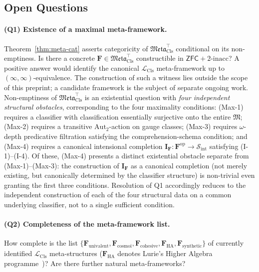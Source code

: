 \documentclass[11pt]{article}
\theoremstyle{plain}
\theoremstyle{definition}
\newcommand{\cS}{\mathcal{S}}
\newcommand{\fM}{\mathfrak{M}}
\newcommand{\Meta}{\mathfrak{Meta}}
\newcommand{\LCls}{\mathcal{L}_{\mathrm{Cls}}}
\newcommand{\Sint}{\cS_{\mathrm{int}}}
\newcommand{\ZFC}{\mathsf{ZFC}}
\newcommand{\II}{\mathbf{I}}
\begin{document}
\subsection{Open Questions}

\paragraph{(Q1) Existence of a maximal meta-framework.} Theorem~\ref{thm:meta-cat} asserts categoricity of $\Meta_{\mathrm{Cls}}^{\top}$ conditional on its non-emptiness. Is there a concrete $\mathbf{F} \in \Meta_{\mathrm{Cls}}^{\top}$ constructible in $\ZFC + 2\text{-inacc}$? A positive answer would identify the canonical $\LCls$ meta-framework up to $(\infty, \infty)$-equivalence. The construction of such a witness lies outside the scope of this preprint; a candidate framework is the subject of separate ongoing work. Non-emptiness of $\Meta_{\mathrm{Cls}}^{\top}$ is an existential question with \emph{four independent structural obstacles}, corresponding to the four maximality conditions: (Max-1) requires a classifier with classification essentially surjective onto the entire $\fM$; (Max-2) requires a transitive $\mathrm{Aut}_2$-action on gauge classes; (Max-3) requires $\omega$-depth predicative filtration satisfying the comprehension-schema condition; and (Max-4) requires a canonical intensional completion $\II_{\mathbf{F}} : \mathbf{F}^{\mathrm{op}} \to \Sint$ satisfying (I-1)--(I-4). Of these, (Max-4) presents a distinct existential obstacle separate from (Max-1)--(Max-3): the construction of $\II_\mathbf{F}$ as a canonical completion (not merely existing, but canonically determined by the classifier structure) is non-trivial even granting the first three conditions. Resolution of Q1 accordingly reduces to the independent construction of each of the four structural data on a common underlying classifier, not to a single sufficient condition.

\paragraph{(Q2) Completeness of the meta-framework list.} How complete is the list $\{\mathbf{F}_{\mathrm{univalent}},\allowbreak \mathbf{F}_{\mathrm{cosmoi}},\allowbreak \mathbf{F}_{\mathrm{cohesive}},\allowbreak \mathbf{F}_{\mathrm{HA}},\allowbreak \mathbf{F}_{\mathrm{synthetic}}\}$ of currently identified $\LCls$ meta-structures ($\mathbf{F}_{\mathrm{HA}}$ denotes Lurie's Higher Algebra programme~\cite{LurieHA})? Are there further natural meta-frameworks?
\end{document}
